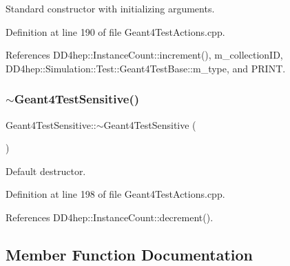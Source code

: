 Standard constructor with initializing arguments. 



Definition at line 190 of file Geant4\+Test\+Actions.\+cpp.



References D\+D4hep\+::\+Instance\+Count\+::increment(), m\+\_\+collection\+ID, D\+D4hep\+::\+Simulation\+::\+Test\+::\+Geant4\+Test\+Base\+::m\+\_\+type, and P\+R\+I\+NT.

\hypertarget{class_d_d4hep_1_1_simulation_1_1_test_1_1_geant4_test_sensitive_a0f7b16af79f07274792ef1690a45d93c}{}\label{class_d_d4hep_1_1_simulation_1_1_test_1_1_geant4_test_sensitive_a0f7b16af79f07274792ef1690a45d93c} 
\subsubsection{\texorpdfstring{$\sim$\+Geant4\+Test\+Sensitive()}{~Geant4TestSensitive()}}
{\footnotesize\ttfamily Geant4\+Test\+Sensitive\+::$\sim$\+Geant4\+Test\+Sensitive (\begin{DoxyParamCaption}{ }\end{DoxyParamCaption})\hspace{0.3cm}{\ttfamily [virtual]}}



Default destructor. 



Definition at line 198 of file Geant4\+Test\+Actions.\+cpp.



References D\+D4hep\+::\+Instance\+Count\+::decrement().



\subsection{Member Function Documentation}
\hypertarget{class_d_d4hep_1_1_simulation_1_1_test_1_1_geant4_test_sensitive_a7d7593372b9bfcc1e1a3f21ceef841d8}{}\label{class_d_d4hep_1_1_simulation_1_1_test_1_1_geant4_test_sensitive_a7d7593372b9bfcc1e1a3f21ceef841d8} 
